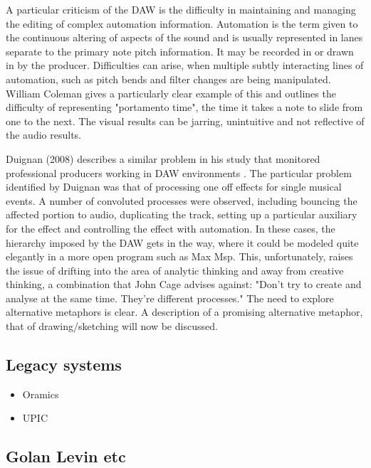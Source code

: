 \documentclass[a4paper,12pt]{article}
\begin{document}
A particular criticism of the DAW is the difficulty in maintaining and managing
the editing of complex automation information. Automation is the term given to
the continuous altering of aspects of the sound and is usually represented in
lanes separate to the primary note pitch information. It may be recorded in or
drawn in by the producer. Difficulties can arise, when multiple subtly
interacting lines of automation, such as pitch bends and filter changes are
being manipulated. William Coleman gives a particularly clear example of this
and outlines the difficulty of representing "portamento time", the time it takes
a note to slide from one to the next. The visual results can be jarring,
unintuitive and not reflective of the audio results.

\begin{caution}
Duignan (2008) describes a similar problem in his study that monitored
professional producers working in DAW environments
\cite[p. 156]{duignan_computer_2008}. The particular problem identified by
Duignan was that of processing one off effects for single musical events. A
number of convoluted processes were observed, including bouncing the affected
portion to audio, duplicating the track, setting up a particular auxiliary for
the effect and controlling the effect with automation. In these cases, the
hierarchy imposed by the DAW gets in the way, where it could be modeled quite
elegantly in a more open program such as Max Msp. This, unfortunately, raises
the issue of drifting into the area of analytic thinking and away from creative
thinking, a combination that John Cage advises against: "Don't try to create and
analyse at the same time. They're different processes." \cite{popova_10_2012} The
need to explore alternative metaphors is clear. A description of a promising
alternative metaphor, that of drawing/sketching will now be discussed.
\end{caution}

\subsection{Legacy systems}
\label{sec:org909edb2}
\begin{itemize}
\item Oramics
\item UPIC
\end{itemize}

\subsection{Golan Levin etc}
\label{sec:org9ae92ab}
\end{document}
